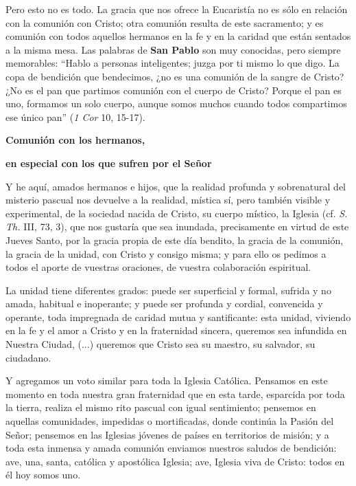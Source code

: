 			\begin{body}Pero esto no es todo. La gracia que nos ofrece la Eucaristía no es sólo en relación con la comunión con Cristo; otra comunión resulta de este sacramento; y es comunión con todos aquellos hermanos en la fe y en la caridad que están sentados a la misma mesa. Las palabras de \textbf{San Pablo} son muy conocidas, pero siempre memorables: “Hablo a personas inteligentes; juzga por ti mismo lo que digo. La copa de bendición que bendecimos, ¿no es una comunión de la sangre de Cristo? ¿No es el pan que partimos comunión con el cuerpo de Cristo? Porque el pan es uno, formamos un solo cuerpo, aunque somos muchos cuando todos compartimos ese único pan” (\textit{1 Cor} 10, 15-17).\end{body}
			
			\begin{bodycenter}\textbf{Comunión con los hermanos, }\end{bodycenter}
			
			\begin{bodycenter}\textbf{en especial con los que sufren por el Señor} \end{bodycenter}
			
			\begin{body}Y he aquí, amados hermanos e hijos, que la realidad profunda y sobrenatural del misterio pascual nos devuelve a la realidad, mística sí, pero también visible y experimental, de la sociedad nacida de Cristo, su cuerpo místico, la Iglesia (cf. \textit{S. Th.} III, 73, 3), que nos gustaría que sea inundada, precisamente en virtud de este Jueves Santo, por la gracia propia de este día bendito, la gracia de la comunión, la gracia de la unidad, con Cristo y consigo misma; y para ello os pedimos a todos el aporte de vuestras oraciones, de vuestra colaboración espiritual. \end{body}
			
			\begin{body}[...] La unidad tiene diferentes grados: puede ser superficial y formal, sufrida y no amada, habitual e inoperante; y puede ser profunda y cordial, convencida y operante, toda impregnada de caridad mutua y santificante: esta unidad, viviendo en la fe y el amor a Cristo y en la fraternidad sincera, queremos sea infundida en Nuestra Ciudad, (...) queremos que Cristo sea su maestro, su salvador, su ciudadano. \end{body}
			
			\begin{body}Y agregamos un voto similar para toda la Iglesia Católica. Pensamos en este momento en toda nuestra gran fraternidad que en esta tarde, esparcida por toda la tierra, realiza el mismo rito pascual con igual sentimiento; pensemos en aquellas comunidades, impedidas o mortificadas, donde continúa la Pasión del Señor; pensemos en las Iglesias jóvenes de países en territorios de misión; y a toda esta inmensa y amada comunión enviamos nuestros saludos de bendición: ave, una, santa, católica y apostólica Iglesia; ave, Iglesia viva de Cristo: todos en él hoy somos uno. \end{body}
			
